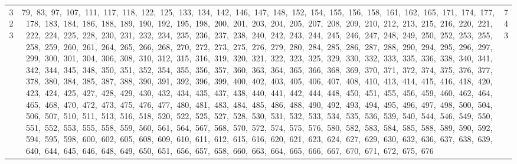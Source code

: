 \begin{longtable}{c|p{}|r}
323 & 79,\ 83,\ 97,\ 107,\ 111,\ 117,\ 118,\ 122,\ 125,\ 133,\ 134,\ 142,\ 146,\ 147,\ 148,\ 152,\ 154,\ 155,\ 156,\ 158,\ 161,\ 162,\ 165,\ 171,\ 174,\ 177,\ 178,\ 183,\ 184,\ 186,\ 188,\ 189,\ 190,\ 192,\ 195,\ 198,\ 200,\ 201,\ 203,\ 204,\ 205,\ 207,\ 208,\ 209,\ 210,\ 212,\ 213,\ 215,\ 216,\ 220,\ 221,\ 222,\ 224,\ 225,\ 228,\ 230,\ 231,\ 232,\ 234,\ 235,\ 236,\ 237,\ 238,\ 240,\ 242,\ 243,\ 244,\ 245,\ 246,\ 247,\ 248,\ 249,\ 250,\ 252,\ 253,\ 255,\ 258,\ 259,\ 260,\ 261,\ 264,\ 265,\ 266,\ 268,\ 270,\ 272,\ 273,\ 275,\ 276,\ 279,\ 280,\ 284,\ 285,\ 286,\ 287,\ 288,\ 290,\ 294,\ 295,\ 296,\ 297,\ 299,\ 300,\ 301,\ 304,\ 306,\ 308,\ 310,\ 312,\ 315,\ 316,\ 319,\ 320,\ 321,\ 322,\ 323,\ 325,\ 329,\ 330,\ 332,\ 333,\ 335,\ 336,\ 338,\ 340,\ 341,\ 342,\ 344,\ 345,\ 348,\ 350,\ 351,\ 352,\ 354,\ 355,\ 356,\ 357,\ 360,\ 363,\ 364,\ 365,\ 366,\ 368,\ 369,\ 370,\ 371,\ 372,\ 374,\ 375,\ 376,\ 377,\ 378,\ 380,\ 384,\ 385,\ 387,\ 388,\ 390,\ 391,\ 392,\ 396,\ 399,\ 400,\ 402,\ 403,\ 405,\ 406,\ 407,\ 408,\ 410,\ 413,\ 414,\ 415,\ 416,\ 418,\ 420,\ 423,\ 424,\ 425,\ 427,\ 428,\ 429,\ 430,\ 432,\ 434,\ 435,\ 437,\ 438,\ 440,\ 441,\ 442,\ 444,\ 448,\ 450,\ 451,\ 455,\ 456,\ 459,\ 460,\ 462,\ 464,\ 465,\ 468,\ 470,\ 472,\ 473,\ 475,\ 476,\ 477,\ 480,\ 481,\ 483,\ 484,\ 485,\ 486,\ 488,\ 490,\ 492,\ 493,\ 494,\ 495,\ 496,\ 497,\ 498,\ 500,\ 504,\ 506,\ 507,\ 510,\ 511,\ 513,\ 516,\ 518,\ 520,\ 522,\ 525,\ 527,\ 528,\ 530,\ 531,\ 532,\ 533,\ 534,\ 535,\ 536,\ 539,\ 540,\ 544,\ 546,\ 549,\ 550,\ 551,\ 552,\ 553,\ 555,\ 558,\ 559,\ 560,\ 561,\ 564,\ 567,\ 568,\ 570,\ 572,\ 574,\ 575,\ 576,\ 580,\ 582,\ 583,\ 584,\ 585,\ 588,\ 589,\ 590,\ 592,\ 594,\ 595,\ 598,\ 600,\ 602,\ 605,\ 608,\ 609,\ 610,\ 611,\ 612,\ 615,\ 616,\ 620,\ 621,\ 623,\ 624,\ 627,\ 629,\ 630,\ 632,\ 636,\ 637,\ 638,\ 639,\ 640,\ 644,\ 645,\ 646,\ 648,\ 649,\ 650,\ 651,\ 656,\ 657,\ 658,\ 660,\ 663,\ 664,\ 665,\ 666,\ 667,\ 670,\ 671,\ 672,\ 675,\ 676 & 743 \\

\end{longtable}
